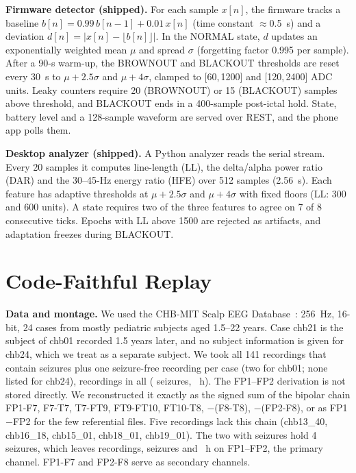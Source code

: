 \documentclass[conference,letterpaper]{IEEEtran}
\begin{document}
\textbf{Firmware detector (shipped).} For each sample $x[n]$, the firmware tracks a baseline $b[n]{=}0.99\,b[n{-}1]{+}0.01\,x[n]$ (time constant $\approx$0.5~s) and a deviation $d[n]{=}|x[n]-\lfloor b[n]\rfloor|$. In the NORMAL state, $d$ updates an exponentially weighted mean $\mu$ and spread $\sigma$ (forgetting factor 0.995 per sample). After a 90-s warm-up, the BROWNOUT and BLACKOUT thresholds are reset every 30~s to $\mu{+}2.5\sigma$ and $\mu{+}4\sigma$, clamped to [60,\,1200] and [120,\,2400] ADC units. Leaky counters require 20 (BROWNOUT) or 15 (BLACKOUT) samples above threshold, and BLACKOUT ends in a 400-sample post-ictal hold. State, battery level and a 128-sample waveform are served over REST, and the phone app polls them.

\textbf{Desktop analyzer (shipped).} A Python analyzer reads the serial stream. Every 20 samples it computes line-length (LL), the delta/alpha power ratio (DAR) and the 30--45-Hz energy ratio (HFE) over 512 samples (2.56~s). Each feature has adaptive thresholds at $\mu{+}2.5\sigma$ and $\mu{+}4\sigma$ with fixed floors (LL: 300 and 600 units). A state requires two of the three features to agree on 7 of 8 consecutive ticks. Epochs with LL above 1500 are rejected as artifacts, and adaptation freezes during BLACKOUT.

\section{Code-Faithful Replay}\label{sec:method}
\textbf{Data and montage.} We used the CHB-MIT Scalp EEG Database~\cite{shoeb2009thesis,goldberger2000physionet}: 256~Hz, 16-bit, 24 cases from mostly pediatric subjects aged 1.5--22 years. Case chb21 is the subject of chb01 recorded 1.5 years later, and no subject information is given for chb24, which we treat as a separate subject. We took all 141 recordings that contain seizures plus one seizure-free recording per case (two for chb01; none listed for chb24), \NRecAll{} recordings in all (\NSzAll{} seizures, \NHoursAll{}~h). The FP1--FP2 derivation is not stored directly. We reconstructed it exactly as the signed sum of the bipolar chain FP1-F7, F7-T7, T7-FT9, FT9-FT10, FT10-T8, $-$(F8-T8), $-$(FP2-F8), or as FP1$-$FP2 for the few referential files. Five recordings lack this chain (chb13\_40, chb16\_18, chb15\_01, chb18\_01, chb19\_01). The two with seizures hold 4 seizures, which leaves \NRec{} recordings, \NSz{} seizures and \NHours{}~h on FP1--FP2, the primary channel. FP1-F7 and FP2-F8 serve as secondary channels.
\end{document}
